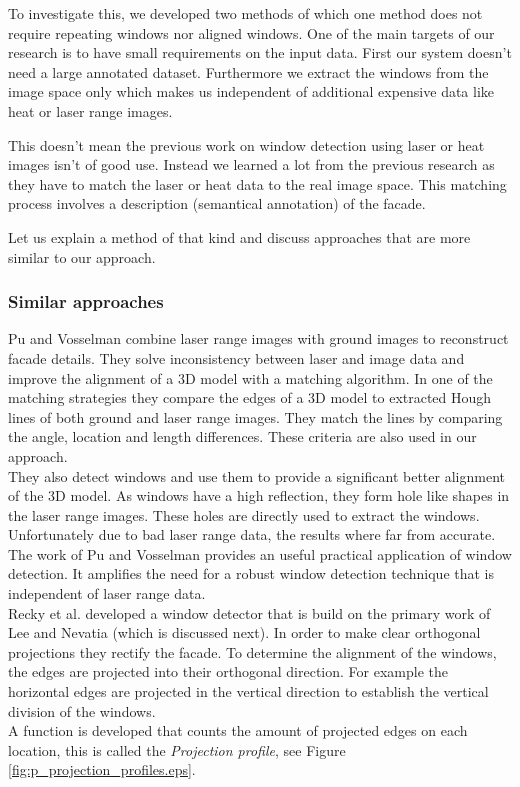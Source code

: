 
To investigate this, we developed two methods of which one method does not
require repeating windows nor aligned windows.  One of the main targets of our research
is to have small requirements on the input data.  First our system doesn't need 
a large annotated dataset. Furthermore we extract the windows from the image
space only which makes us independent of additional expensive data like heat or laser range images.

This doesn't mean the previous work on window detection using laser or heat
images isn't of good use.  Instead we learned a lot from the previous research
as they have to match the laser or heat data to the real image space.  This
matching process involves a description (semantical annotation) of the facade.

Let us explain a method of that kind and discuss approaches that are more
similar to our approach.\\

\subsubsection{Similar approaches}
Pu and Vosselman \cite{Pu_refiningbuilding} combine laser range images with
ground images to reconstruct facade details.  They solve inconsistency between
laser and image data and improve the alignment of a 3D model with a matching
algorithm.  In one of the matching strategies they compare the edges of a 3D
model to extracted Hough lines of both ground and laser range images.  They
match the lines by comparing the angle, location and length differences. These
criteria are also used in our approach.\\

They also detect windows and use them to provide a significant better alignment
of the 3D model.  As windows have a high reflection, they form hole like shapes
in the laser range images.  These holes are directly used to extract the
windows. Unfortunately due to bad laser range data, the results where far from
accurate.\\

The work of Pu and Vosselman \cite{Pu_refiningbuilding} provides an useful
practical application of window detection. It amplifies the need for a robust
window detection technique that is independent of laser range data.\\


Recky et al. \cite{Recky_kmeans} developed a window detector that is build on
the primary work of Lee and Nevatia \cite{Lee_extraction} (which is discussed
next).  In order to make clear orthogonal projections they rectify the facade. 
To determine the alignment of the windows, the edges are projected into their orthogonal direction. 
For example the horizontal edges are projected in the vertical direction to 
establish the vertical division of the windows.\\
A function is developed that counts the amount of projected edges on each
location, this is called the \emph{Projection profile}, see Figure
\ref{fig:p_projection_profiles.eps}.

